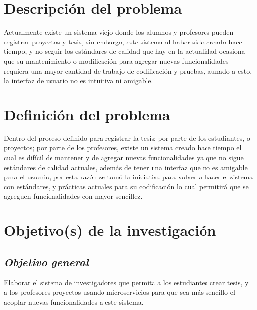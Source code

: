
\section{Descripción del problema} \label{descripcionproblema}

    Actualmente existe un sistema viejo donde los alumnos y profesores pueden registrar proyectos y tesis, sin embargo, este sistema al haber sido creado hace tiempo, y no seguir los estándares de calidad que hay en la actualidad ocasiona que su mantenimiento o modificación para agregar nuevas funcionalidades requiera una mayor cantidad de trabajo de codificación y pruebas, aunado a esto, la interfaz de usuario no es intuitiva ni amigable.

\section{Definición del problema} \label{definicionproblema}
    
    Dentro del proceso definido para registrar la tesis; por parte de los estudiantes, o proyectos; por parte de los profesores, existe un sistema creado hace tiempo el cual es difícil de mantener y de agregar nuevas funcionalidades ya que no sigue estándares de calidad actuales, además de tener una interfaz que no es amigable para el usuario, por esta razón se tomó la iniciativa para volver a hacer el sistema con estándares, y prácticas actuales para su codificación lo cual permitirá que se agreguen funcionalidades con mayor sencillez.

\section{Objetivo(s) de la investigación} \label{objetivoinvestigacion}
    
    \subsection{\textbf{\textit{Objetivo general}}} %
    Elaborar el sistema de investigadores que permita a los estudiantes crear tesis, y a los profesores proyectos usando microservicios para que sea más sencillo el acoplar nuevas funcionalidades a este sistema.
    
